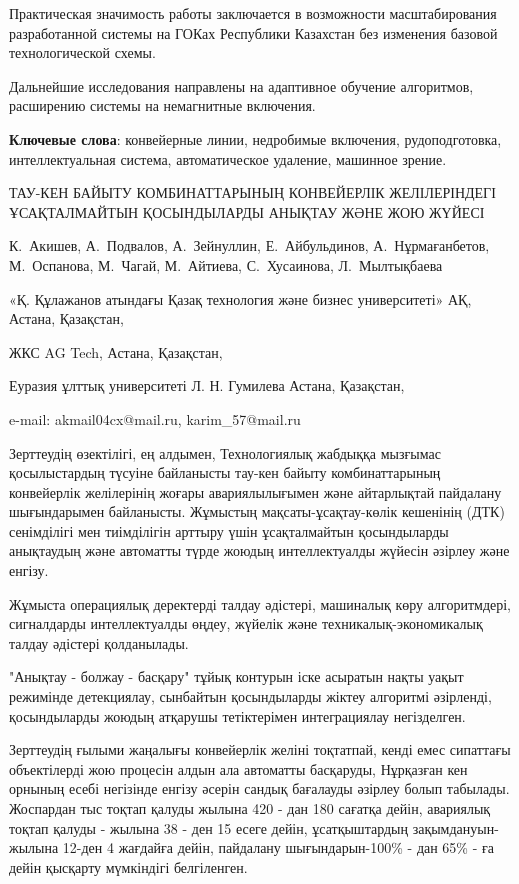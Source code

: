 Практическая значимость работы заключается в возможности масштабирования
разработанной системы на ГОКах Республики Казахстан без изменения
базовой технологической схемы.

Дальнейшие исследования направлены на адаптивное обучение алгоритмов,
расширению системы на немагнитные включения.

{\bfseries Ключевые слова}: конвейерные линии, недробимые включения,
рудоподготовка, интеллектуальная система, автоматическое удаление,
машинное зрение.

\begin{header}
ТАУ-КЕН БАЙЫТУ КОМБИНАТТАРЫНЫҢ КОНВЕЙЕРЛІК ЖЕЛІЛЕРІНДЕГІ ҰСАҚТАЛМАЙТЫН ҚОСЫНДЫЛАРДЫ АНЫҚТАУ ЖӘНЕ ЖОЮ ЖҮЙЕСІ

К.~Акишев\envelope,
А.~Подвалов,
А.~Зейнуллин\envelope,
Е.~Айбульдинов\envelope,
А.~Нұрмағанбетов,
М.~Оспанова,
М.~Чагай,
М.~Айтиева,
С.~Хусаинова,
Л.~Мылтықбаева
\end{header}

\begin{affil}
«Қ. Құлажанов атындағы Қазақ технология және бизнес университеті» АҚ, Астана, Қазақстан,

ЖКС AG Tech, Астана, Қазақстан,

Еуразия ұлттық университеті Л. Н. Гумилева Астана, Қазақстан,

e-mail: akmail04cx@mail.ru, karim\_57@mail.ru
\end{affil}

Зерттеудің өзектілігі, ең алдымен, Технологиялық жабдыққа мызғымас
қосылыстардың түсуіне байланысты тау-кен байыту комбинаттарының
конвейерлік желілерінің жоғары авариялылығымен және айтарлықтай
пайдалану шығындарымен байланысты. Жұмыстың мақсаты-ұсақтау-көлік
кешенінің (ДТК) сенімділігі мен тиімділігін арттыру үшін ұсақталмайтын
қосындыларды анықтаудың және автоматты түрде жоюдың интеллектуалды
жүйесін әзірлеу және енгізу.

Жұмыста операциялық деректерді талдау әдістері, машиналық көру
алгоритмдері, сигналдарды интеллектуалды өңдеу, жүйелік және
техникалық-экономикалық талдау әдістері қолданылады.

"Анықтау - болжау - басқару" тұйық контурын іске асыратын нақты уақыт
режимінде детекциялау, сынбайтын қосындыларды жіктеу алгоритмі
әзірленді, қосындыларды жоюдың атқарушы тетіктерімен интеграциялау
негізделген.

Зерттеудің ғылыми жаңалығы конвейерлік желіні тоқтатпай, кенді емес
сипаттағы объектілерді жою процесін алдын ала автоматты басқаруды,
Нұрқазған кен орнының есебі негізінде енгізу әсерін сандық бағалауды
әзірлеу болып табылады. Жоспардан тыс тоқтап қалуды жылына 420 - дан 180
сағатқа дейін, авариялық тоқтап қалуды - жылына 38 - ден 15 есеге дейін,
ұсатқыштардың зақымдануын-жылына 12-ден 4 жағдайға дейін, пайдалану
шығындарын-100\% - дан 65\% - ға дейін қысқарту мүмкіндігі белгіленген.

